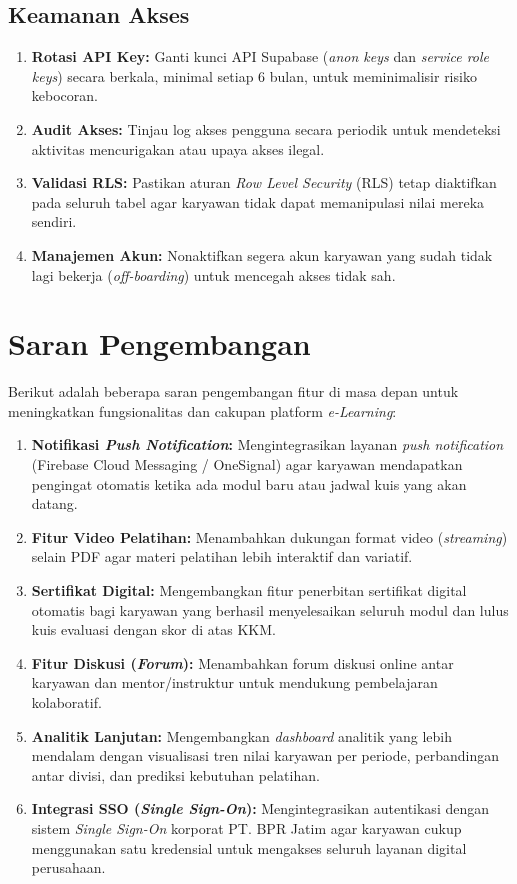 \subsection{Keamanan Akses}
\begin{enumerate}
    \item \textbf{Rotasi API Key:} Ganti kunci API Supabase (\textit{anon keys} dan \textit{service role keys}) secara berkala, minimal setiap 6 bulan, untuk meminimalisir risiko kebocoran.
    \item \textbf{Audit Akses:} Tinjau log akses pengguna secara periodik untuk mendeteksi aktivitas mencurigakan atau upaya akses ilegal.
    \item \textbf{Validasi RLS:} Pastikan aturan \textit{Row Level Security} (RLS) tetap diaktifkan pada seluruh tabel agar karyawan tidak dapat memanipulasi nilai mereka sendiri.
    \item \textbf{Manajemen Akun:} Nonaktifkan segera akun karyawan yang sudah tidak lagi bekerja (\textit{off-boarding}) untuk mencegah akses tidak sah.
\end{enumerate}

\section{Saran Pengembangan}
Berikut adalah beberapa saran pengembangan fitur di masa depan untuk meningkatkan fungsionalitas dan cakupan platform \textit{e-Learning}:

\begin{enumerate}
    \item \textbf{Notifikasi \textit{Push Notification}:} Mengintegrasikan layanan \textit{push notification} (Firebase Cloud Messaging / OneSignal) agar karyawan mendapatkan pengingat otomatis ketika ada modul baru atau jadwal kuis yang akan datang.
    \item \textbf{Fitur Video Pelatihan:} Menambahkan dukungan format video (\textit{streaming}) selain PDF agar materi pelatihan lebih interaktif dan variatif.
    \item \textbf{Sertifikat Digital:} Mengembangkan fitur penerbitan sertifikat digital otomatis bagi karyawan yang berhasil menyelesaikan seluruh modul dan lulus kuis evaluasi dengan skor di atas KKM.
    \item \textbf{Fitur Diskusi (\textit{Forum}):} Menambahkan forum diskusi online antar karyawan dan mentor/instruktur untuk mendukung pembelajaran kolaboratif.
    \item \textbf{Analitik Lanjutan:} Mengembangkan \textit{dashboard} analitik yang lebih mendalam dengan visualisasi tren nilai karyawan per periode, perbandingan antar divisi, dan prediksi kebutuhan pelatihan.
    \item \textbf{Integrasi SSO (\textit{Single Sign-On}):} Mengintegrasikan autentikasi dengan sistem \textit{Single Sign-On} korporat PT. BPR Jatim agar karyawan cukup menggunakan satu kredensial untuk mengakses seluruh layanan digital perusahaan.
\end{enumerate}

